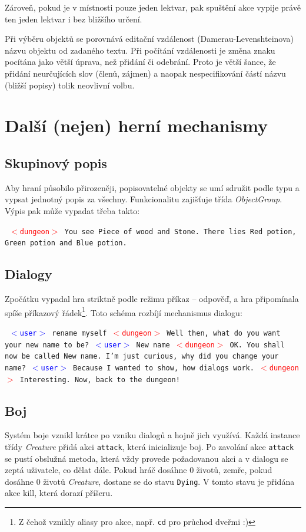 \documentclass[11pt, a4paper]{article}
\def\class#1{\emph{#1}}
\newenvironment{example}%
{\smallskip\noindent\ignorespaces\obeylines\tt}%
{\smallskip\par\noindent
\ignorespacesafterend}
\def\user{\textcolor{blue}{$<$user$>$ }}
\def\dung{\textcolor{red}{$<$dungeon$>$ }}
\begin{document}
Zároveň, pokud je v místnosti pouze jeden lektvar, pak spuštění akce vypije právě ten jeden lektvar i bez bližšího určení.

Při výběru objektů se porovnává editační vzdálenost (Damerau-Levenshteinova) názvu objektu od zadaného textu. Při počítání vzdálenosti je změna znaku pocítána jako větší úprava, než přidání či odebrání. Proto je větší šance, že přidání neurčujících slov (členů, zájmen) a naopak nespecifikování částí názvu (bližší popisy) tolik neovlivní volbu.

\section{Další (nejen) herní mechanismy}

\subsection{Skupinový popis}

Aby hraní působilo přirozeněji, popisovatelné objekty se umí sdružit podle typu a vypsat jednotný popis za všechny. Funkcionalitu zajišťuje třída \class{ObjectGroup}. Výpis pak může vypadat třeba takto:

\begin{example}
\dung You see Piece of wood and Stone. There lies Red potion, Green
potion and Blue potion. 
\end{example}

\subsection{Dialogy}
\label{dialogs}
Zpočátku vypadal hra striktně podle režimu příkaz -- odpověď, a hra připomínala spíše příkazový řádek\footnote{Z čehož vznikly aliasy pro akce, např. \texttt{cd} pro průchod dveřmi :)}. Toto schéma rozbíjí mechanismus dialogu:

\begin{example}
\user rename myself
\dung Well then, what do you want your new name to be?
\user New name
\dung OK. You shall now be called New name. I'm just curious, why did 
you change your name?
\user Because I wanted to show, how dialogs work.
\dung Interesting. Now, back to the dungeon!
\end{example}

\subsection{Boj}
\label{combat}
Systém boje vznikl krátce po vzniku dialogů a hojně jich využívá. Každá instance třídy \class{Creature} přidá akci \texttt{attack}, která inicializuje boj. Po zavolání akce \texttt{attack} se pustí obslužná metoda, která vždy provede požadovanou akci a v dialogu se zeptá uživatele, co dělat dále. Pokud hráč dosáhne 0 životů, zemře, pokud dosáhne 0 životů \class{Creature}, dostane se do stavu \texttt{Dying}. V tomto stavu je přidána akce kill, která dorazí příšeru.
\end{document}
